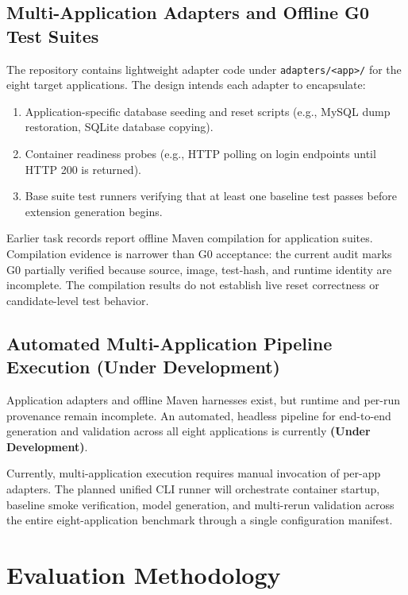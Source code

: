 \documentclass[pdflatex,sn-mathphys-num]{sn-jnl}
\begin{document}
\subsection{Multi-Application Adapters and Offline G0 Test Suites}

The repository contains lightweight adapter code under \texttt{adapters/<app>/} for the eight target applications. The design intends each adapter to encapsulate:
\begin{enumerate}
    \item Application-specific database seeding and reset scripts (e.g., MySQL dump restoration, SQLite database copying).
    \item Container readiness probes (e.g., HTTP polling on login endpoints until HTTP 200 is returned).
    \item Base suite test runners verifying that at least one baseline test passes before extension generation begins.
\end{enumerate}
Earlier task records report offline Maven compilation for application suites. Compilation evidence is narrower than G0 acceptance: the current audit marks G0 partially verified because source, image, test-hash, and runtime identity are incomplete. The compilation results do not establish live reset correctness or candidate-level test behavior.

\subsection{Automated Multi-Application Pipeline Execution (Under Development)}\label{subsec:multi-app-pipeline-dev}

Application adapters and offline Maven harnesses exist, but runtime and per-run provenance remain incomplete. An automated, headless pipeline for end-to-end generation and validation across all eight applications is currently \textbf{(Under Development)}.

Currently, multi-application execution requires manual invocation of per-app adapters. The planned unified CLI runner will orchestrate container startup, baseline smoke verification, model generation, and multi-rerun validation across the entire eight-application benchmark through a single configuration manifest.


\section{Evaluation Methodology}\label{sec:evaluation}
\end{document}
